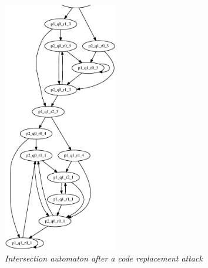 \begin{figure}
\begin{center}
\includegraphics[width= 50mm]{graph_replaced.eps}
\end{center}
\caption{{\em Intersection automaton after a code replacement attack}}
\label{graph_replaced}
\end{figure}

